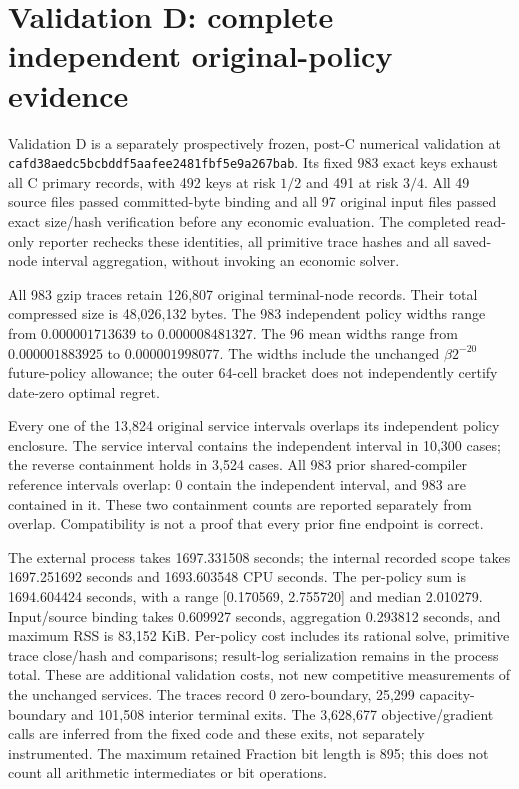 \section{Validation D: complete independent original-policy evidence}
\label{sec:development119d}
Validation D is a separately prospectively frozen, post-C numerical validation
at \texttt{cafd38aedc5bcbddf5aafee2481fbf5e9a267bab}.
Its fixed 983 exact keys exhaust all C primary records, with 492 keys at risk
$1/2$ and 491 at risk $3/4$. All 49 source files passed committed-byte binding
and all 97 original input files passed exact size/hash verification before
any economic evaluation. The completed read-only reporter rechecks these
identities, all primitive trace hashes and all saved-node interval aggregation,
without invoking an economic solver.

All 983 gzip traces retain 126,807 original terminal-node records. Their total
compressed size is 48,026,132 bytes.
The 983 independent policy widths range from
$0.000001713639$ to
$0.000008481327$.
The 96 mean widths range from $0.000001883925$
to $0.000001998077$.
The widths include the unchanged $\beta 2^{-20}$ future-policy allowance;
the outer 64-cell bracket does not independently certify date-zero optimal regret.

Every one of the 13,824 original service intervals overlaps its independent
policy enclosure. The service interval contains the independent interval in
10,300 cases; the reverse containment holds
in 3,524 cases. All 983 prior shared-compiler
reference intervals overlap: 0 contain
the independent interval, and 983 are
contained in it. These two containment counts are reported separately from
overlap. Compatibility is not a proof that every prior fine endpoint is correct.

The external process takes 1697.331508 seconds;
the internal recorded scope takes 1697.251692
seconds and 1693.603548 CPU seconds. The per-policy sum is
1694.604424 seconds, with a range
[0.170569, 2.755720]
and median 2.010279. Input/source binding takes
0.609927 seconds, aggregation
0.293812 seconds, and maximum RSS is
83,152 KiB. Per-policy cost includes its rational solve,
primitive trace close/hash and comparisons; result-log serialization remains
in the process total. These are additional validation costs, not new competitive
measurements of the unchanged services. The traces record
0 zero-boundary,
25,299 capacity-boundary and
101,508 interior terminal exits.
The 3,628,677
objective/gradient calls are inferred from the fixed code and these exits,
not separately instrumented. The maximum retained Fraction bit length is
895; this does not count all arithmetic
intermediates or bit operations.


